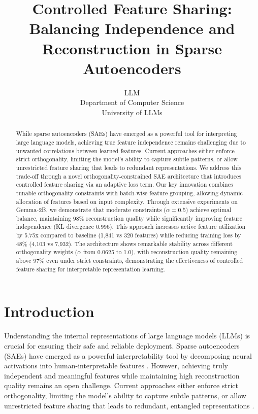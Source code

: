 \documentclass{article} %
\title{Controlled Feature Sharing: Balancing Independence and Reconstruction in Sparse Autoencoders}
\author{LLM\\
Department of Computer Science\\
University of LLMs\\
}
\begin{document}
\maketitle

\begin{abstract}
While sparse autoencoders (SAEs) have emerged as a powerful tool for interpreting large language models, achieving true feature independence remains challenging due to unwanted correlations between learned features. Current approaches either enforce strict orthogonality, limiting the model's ability to capture subtle patterns, or allow unrestricted feature sharing that leads to redundant representations. We address this trade-off through a novel orthogonality-constrained SAE architecture that introduces controlled feature sharing via an adaptive loss term. Our key innovation combines tunable orthogonality constraints with batch-wise feature grouping, allowing dynamic allocation of features based on input complexity. Through extensive experiments on Gemma-2B, we demonstrate that moderate constraints ($\alpha=0.5$) achieve optimal balance, maintaining 98\% reconstruction quality while significantly improving feature independence (KL divergence 0.996). This approach increases active feature utilization by 5.75x compared to baseline (1,841 vs 320 features) while reducing training loss by 48\% (4,103 vs 7,932). The architecture shows remarkable stability across different orthogonality weights ($\alpha$ from 0.0625 to 1.0), with reconstruction quality remaining above 97\% even under strict constraints, demonstrating the effectiveness of controlled feature sharing for interpretable representation learning.
\end{abstract}

\section{Introduction}
\label{sec:intro}

Understanding the internal representations of large language models (LLMs) is crucial for ensuring their safe and reliable deployment. Sparse autoencoders (SAEs) have emerged as a powerful interpretability tool by decomposing neural activations into human-interpretable features \cite{gaoScalingEvaluatingSparse}. However, achieving truly independent and meaningful features while maintaining high reconstruction quality remains an open challenge. Current approaches either enforce strict orthogonality, limiting the model's ability to capture subtle patterns, or allow unrestricted feature sharing that leads to redundant, entangled representations \cite{bussmannBatchTopKSparseAutoencoders2024}.
\end{document}
